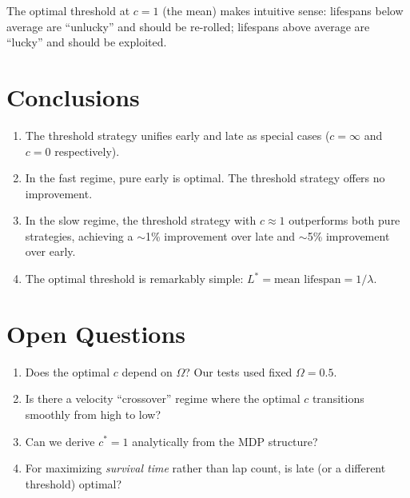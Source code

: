 \documentclass{article}
\begin{document}
The optimal threshold at $c = 1$ (the mean) makes intuitive sense: lifespans below average are ``unlucky'' and should be re-rolled; lifespans above average are ``lucky'' and should be exploited.

\section{Conclusions}

\begin{enumerate}
    \item The threshold strategy unifies early and late as special cases ($c = \infty$ and $c = 0$ respectively).
    
    \item In the fast regime, pure early is optimal. The threshold strategy offers no improvement.
    
    \item In the slow regime, the threshold strategy with $c \approx 1$ outperforms both pure strategies, achieving a $\sim$1\% improvement over late and $\sim$5\% improvement over early.
    
    \item The optimal threshold is remarkably simple: $L^* = \text{mean lifespan} = 1/\lambda$.
\end{enumerate}

\section{Open Questions}

\begin{enumerate}
    \item Does the optimal $c$ depend on $\Omega$? Our tests used fixed $\Omega = 0.5$.
    
    \item Is there a velocity ``crossover'' regime where the optimal $c$ transitions smoothly from high to low?
    
    \item Can we derive $c^* = 1$ analytically from the MDP structure?
    
    \item For maximizing \emph{survival time} rather than lap count, is late (or a different threshold) optimal?
\end{enumerate}
\end{document}
